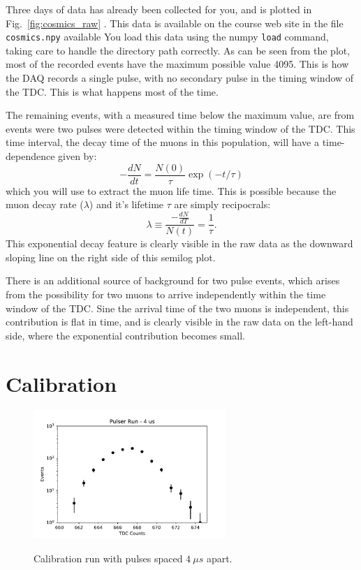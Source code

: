 Three days of data has already been collected for you, and is plotted
in Fig.~\ref{fig:cosmics_raw} .  This data is available on the course
web site in the file {\tt cosmics.npy} available You load this data
using the numpy {\tt load} command, taking care to handle the
directory path correctly.  As can be seen from the plot, most of the
recorded events have the maximum possible value 4095.  This is how the
DAQ records a single pulse, with no secondary pulse in the timing
window of the TDC.  This is what happens most of the time.

The remaining events, with a measured time below the maximum value, are from events were two pulses were detected within the timing window of the TDC.  This time
interval, the decay time of the muons in this population, will have a
time-dependence given by:
\begin{displaymath}
-\frac{dN}{dt} = \frac{N(0)}{\tau} \exp(-t/\tau)
\end{displaymath}
which you will use to extract the muon life time.  This is possible because the muon decay rate ($\lambda$)
and it's lifetime $\tau$ are simply recipocrals:
\begin{displaymath}
\lambda \equiv \frac{-\frac{dN}{dT}}{N(t)} = \frac{1}{\tau}.
\end{displaymath}
This exponential decay feature is clearly visible in the raw data as the downward sloping line on the right side of this semilog plot.

There is an additional source of background for two pulse events, which arises from the possibility for two muons to arrive independently within the time window of the TDC.   Sine the arrival time of the two muons is independent, this contribution is flat in time, and is clearly visible in the raw data on the left-hand side, where the exponential contribution becomes small.

\section{Calibration}

\begin{figure}[htbp]
\begin{center}
{\includegraphics[width=0.65\textwidth]{figs/labs/muon/pulser_4_raw.pdf}}\\
\end{center}
\caption{\label{fig:pulser_raw}  Calibration run with pulses spaced $4~\mu s$ apart.}
\end{figure}

